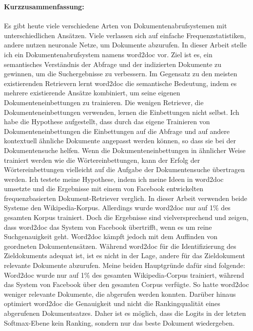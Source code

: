 \documentclass[english, ngerman]{KITreprt}
\begin{document}
\vspace*{\fill}
\cleardoublepage


\thispagestyle{empty}
\newpage
\vspace*{\fill}
\noindent
\textbf{Kurzzusammenfassung:}\\
\\
\noindent
Es gibt heute viele verschiedene Arten von Dokumentenabrufsystemen mit unterschiedlichen Ansätzen. Viele verlassen
sich auf einfache Frequenzstatistiken, andere nutzen neuronale Netze, um Dokumente abzurufen. In dieser Arbeit stelle
ich ein Dokumentenabrufsystem namens word2doc vor. Ziel ist es, ein semantisches Verständnis der Abfrage und der
indizierten Dokumente zu gewinnen, um die Suchergebnisse zu verbessern. Im Gegensatz zu den meisten existierenden
Retrievern lernt word2doc die semantische Bedeutung, indem es mehrere existierende Ansätze kombiniert, um seine
eigenen Dokumenteneinbettungen zu trainieren. Die wenigen Retriever, die Dokumenteneinbettungen verwenden, lernen die
Einbettungen nicht selbst. Ich habe die Hypothese aufgestellt, dass durch das eigene Trainieren von
Dokumenteneinbettungen die Einbettungen auf die Abfrage und auf andere kontextuell ähnliche Dokumente angepasst werden
können, so dass sie bei der Dokumentensuche helfen. Wenn die Dokumenteneinbettungen in ähnlicher Weise trainiert werden
wie die Wörtereinbettungen, kann der Erfolg der Wörtereinbettungen vielleicht auf die Aufgabe der Dokumentensuche
übertragen werden. Ich testete meine Hypothese, indem ich meine Ideen in word2doc umsetzte und die Ergebnisse mit
einem von Facebook entwickelten frequenzbasierten Dokument-Retriever verglich. In dieser Arbeit verwenden beide Systeme
den Wikipedia-Korpus. Allerdings wurde word2doc nur auf 1\% des gesamten Korpus trainiert. Doch die Ergebnisse sind
vielversprechend und zeigen, dass word2doc das System von Facebook übertrifft, wenn es um reine Suchgenauigkeit geht.
Word2doc kämpft jedoch mit dem Auffinden von geordneten Dokumentensätzen. Während word2doc für die Identifizierung des
Zieldokuments adequat ist, ist es nicht in der Lage, andere für das Zieldokument relevante Dokumente abzurufen. Meine
beiden Hauptgründe dafür sind folgende: Word2doc wurde nur auf 1\% des gesamten Wikipedia-Corpus trainiert, während das
System von Facebook über den gesamten Corpus verfügte. So hatte word2doc weniger relevante Dokumente, die abgerufen
werden konnten. Darüber hinaus optimiert word2doc die Genauigkeit und nicht die Rankingqualität eines abgerufenen
Dokumentsatzes. Daher ist es möglich, dass die Logits in der letzten Softmax-Ebene kein Ranking, sondern nur das beste
Dokument wiedergeben.
\end{document}
